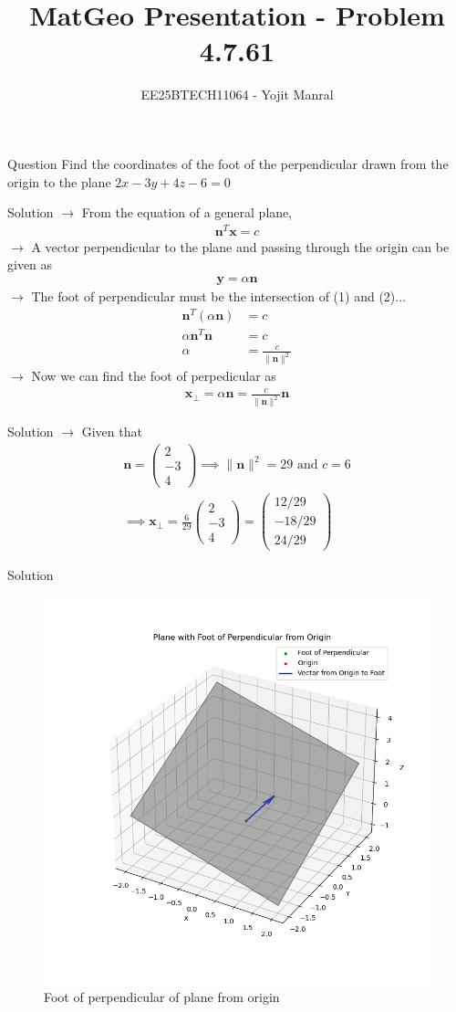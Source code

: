 \documentclass{beamer}
\title{MatGeo Presentation - Problem 4.7.61}
\author{EE25BTECH11064 - Yojit Manral}
\date{}
\numberwithin{equation}{section}
\theoremstyle{remark}
\providecommand{\norm}[1]{\lVert#1\rVert}
\newcommand{\myvec}[1]{\ensuremath{\begin{pmatrix}#1\end{pmatrix}}}
\let\vec\mathbf
\begin{document}
\frame{\titlepage}
\begin{frame}{Question}
Find the coordinates of the foot of the perpendicular drawn from the origin to the plane $2x - 3y + 4z - 6 = 0$
\end{frame}

\begin{frame}{Solution}
$\rightarrow$ From the equation of a general plane,
\begin{align} \vec{n}^{T}\vec{x} = c \end{align}
$\rightarrow$ A vector perpendicular to the plane and passing through the origin can be given as \begin{align} \vec{y} = \alpha \vec{n} \end{align}
$\rightarrow$ The foot of perpendicular must be the intersection of (1) and (2)...
\begin{align}
    \vec{n}^{T} (\alpha \vec{n}) &= c \\
    \alpha \vec{n}^{T} \vec{n} &= c \\
    \alpha &= \frac{c}{\norm{\vec{n}}^{2}}
\end{align}
$\rightarrow$ Now we can find the foot of perpedicular as
\begin{align} \vec{x_\perp} = \alpha \vec{n} = \frac{c}{\norm{\vec{n}}^{2}} \vec{n} \end{align}
\end{frame}

\begin{frame}{Solution}
$\rightarrow$ Given that
\begin{align}
    \vec{n} = \myvec{2\\-3\\4} \implies \norm{\vec{n}}^{2} = 29 \text{  and  } c = 6 \\
    \implies \vec{x_\perp} = \frac{6}{29} \myvec{2\\-3\\4} = \myvec{12/29\\-18/29\\24/29}
\end{align}
\end{frame}
\begin{frame}{Solution}
\begin{figure}[h!]
   \centering
   \includegraphics[width=0.6\linewidth]{figs/01.png}
   \caption{Foot of perpendicular of plane from origin}
   \label{Plot_1}
\end{figure}
\end{frame}
\end{document}
